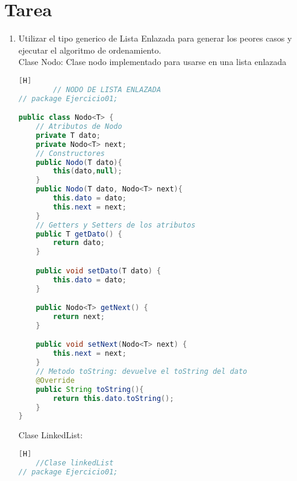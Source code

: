 \section{Tarea}
\begin{enumerate}[{Ejercicio} 1.]
	\item Utilizar el tipo generico de Lista Enlazada para generar los peores casos y ejecutar el
	algoritmo de ordenamiento.\\
	Clase Nodo: Clase nodo implementado para usarse en una lista enlazada
	\begin{lstlisting}[language=java, caption={Node}][H]
		// NODO DE LISTA ENLAZADA
// package Ejercicio01;

public class Nodo<T> {
    // Atributos de Nodo
    private T dato;
    private Nodo<T> next;
    // Constructores
    public Nodo(T dato){
        this(dato,null);
    }
    public Nodo(T dato, Nodo<T> next){
        this.dato = dato;
        this.next = next;
    }
    // Getters y Setters de los atributos
    public T getDato() {
        return dato;
    }

    public void setDato(T dato) {
        this.dato = dato;
    }

    public Nodo<T> getNext() {
        return next;
    }

    public void setNext(Nodo<T> next) {
        this.next = next;
    }
    // Metodo toString: devuelve el toString del dato
    @Override
    public String toString(){
        return this.dato.toString();
    }
}

	\end{lstlisting}
	Clase LinkedList: 
	\begin{lstlisting}[language=java, caption={LinkedList}][H]
	//Clase linkedList
// package Ejercicio01;


\end{lstlisting}
\end{enumerate}
